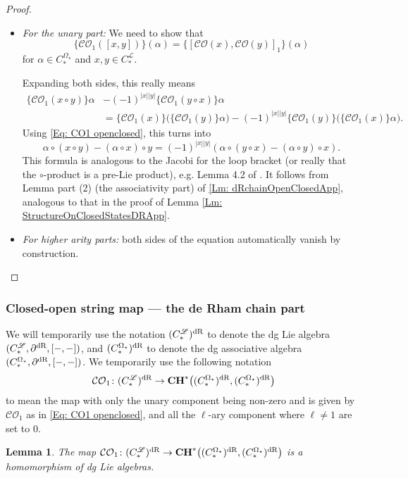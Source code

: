 \documentclass[10pt]{amsart}
\numberwithin{equation}{section}
\theoremstyle{plain}
\newtheorem{lemma}[theorem]{Lemma}
\theoremstyle{definition}
\theoremstyle{remark}
\numberwithin{equation}{section}
\newcommand{\dR}{\textup{dR}}
\newcommand{\CO}{\mathcal{CO}}
\newcommand{\CC}{\textbf{\textup{CH}}}
\newcommand{\CFr}{C_*^\mathscr{L}}
\newcommand{\CBa}{C_*^{\Omega_\star}}
\begin{document}
{\begin{proof}
\begin{itemize}
	\bigskip
	



\item 	
\emph{For the unary part:} We need to show that 
\[   \big\{\CO_1([x,y])\big\}(\alpha) = \big\{[\CO(x),\CO(y)]_1\big\}(\alpha) \] for $\alpha\in \CBa$ and $x, y\in \CFr$.

		Expanding both sides, this really means 
\begin{align*}
	\big\{\CO_1(x\circ y)\big\} \alpha &- (-1)^{|x||y|} \big\{ \CO_1(y\circ x)\big\} \alpha \\
	&= \big\{\CO_1(x)\big\}\big(\{\CO_1(y)\}\alpha\big) - (-1)^{|x||y|}\big\{\CO_1(y)\big\} \big( \{\CO_1(x)\} \alpha\big).
\end{align*}
Using \eqref{Eq: CO1 openclosed}, this turns into \[ \alpha\circ (x\circ y) - (\alpha\circ x)\circ y = (-1)^{|x||y|} \left(\alpha\circ (y\circ x) - (\alpha\circ y ) \circ x\right). \]
This formula is analogous to the Jacobi for the loop bracket (or really that the $\circ$-product is a pre-Lie product), e.g. Lemma 4.2 of \cite{ChasSullivan}.
It follows from Lemma part (2) (the associativity part) of \ref{Lm: dRchainOpenClosedApp}, analogous to that in the proof of Lemma \ref{Lm: StructureOnClosedStatesDRApp}.




\bigskip

\item \emph{For higher arity parts:} both sides of the equation automatically vanish by construction. 
\end{itemize}
\end{proof}



\subsubsection{Closed-open string map --- the de Rham chain part}
We will temporarily use the notation $(\CFr)^\dR$ to denote the dg Lie algebra $(\CFr,\partial^\dR, [-,-])$, and $(\CBa)^\dR$ to denote the dg associative algebra $(\CBa, \partial^\dR, [-,-])$.
We temporarily use the following notation
\begin{align*}
	\CO_1\colon (\CFr)^\dR \to \CC^*\big((\CBa)^\dR, (\CBa)^\dR\big)
\end{align*}
to mean the map with only the unary component being non-zero and is given by $\CO_1$ as in \eqref{Eq: CO1 openclosed}, and all the $\ell$-ary component where $\ell\neq 1$ are set to 0.
\begin{lemma}\label{Lm: OCdR dgLaHomomApp}
	The map $\CO_1\colon (\CFr)^\dR \to \CC^*\big((\CBa)^\dR, (\CBa)^\dR\big)$ is a homomorphism of dg Lie algebras.
\end{lemma}



}
\end{document}
